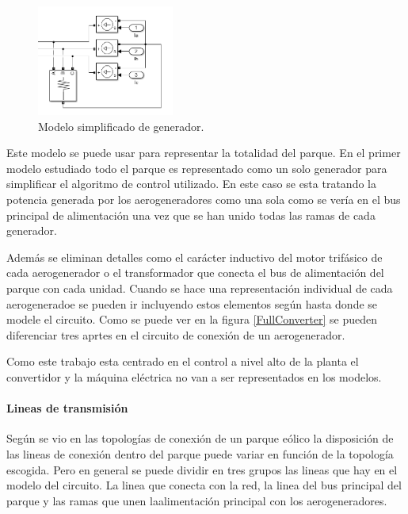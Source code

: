 \documentclass{book}
\begin{document}
\begin{figure}[h!]
\centering
\includegraphics[width=0.4\textwidth]{SimpleGenerator.PNG}
\caption{Modelo simplificado de generador. }
\label{SimpleGenerator}
\end{figure} \par

Este modelo se puede usar para representar la totalidad del parque. En el primer modelo estudiado todo el parque es representado como un solo generador para simplificar el algoritmo de control utilizado. En este caso se esta tratando la potencia generada por los aerogeneradores como una sola como se ver\'ia en el bus principal de alimentaci\'on una vez que se han unido todas las ramas de cada generador. \par

Además se eliminan detalles como el car\'acter inductivo del motor trif\'asico de cada aerogenerador o el transformador que conecta el bus de alimentaci\'on del parque con cada unidad. Cuando se hace una representaci\'on individual de cada aerogeneradoe se pueden ir incluyendo estos elementos seg\'un hasta donde se modele el circuito. Como se puede ver en la figura \ref{FullConverter} se pueden diferenciar tres aprtes en el circuito de conexi\'on de un aerogenerador. 


Como este trabajo esta centrado en el control a nivel alto de la planta el convertidor y la m\'aquina el\'ectrica no van a ser representados en los modelos. \par
		
		\paragraph{Lineas de transmisi\'on}

Seg\'un se vio en las topolog\'ias de conexi\'on de un parque e\'olico la disposici\'on de las lineas de conexi\'on dentro del parque puede variar en funci\'on de la topolog\'ia escogida. Pero en general se puede dividir en tres grupos las lineas que hay en el modelo del circuito. La linea que conecta con la red, la linea del bus principal del parque y las ramas que unen laalimentaci\'on principal con los aerogeneradores. \par
\end{document}
